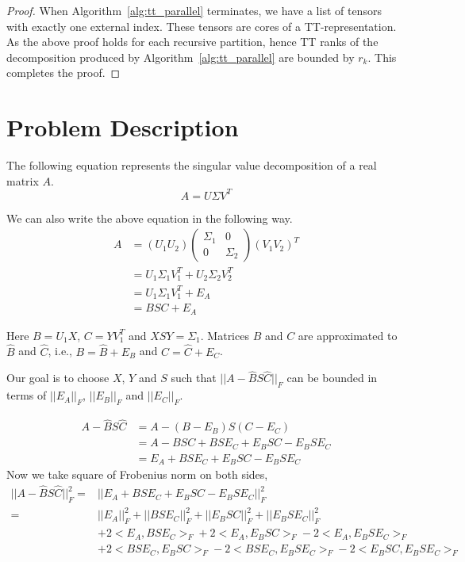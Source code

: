 \documentclass[runningheads]{llncs}
\begin{document}
\begin{proof}
	When Algorithm~\ref{alg:tt_parallel} terminates, we have a list of tensors with exactly one external index. These tensors are cores of a TT-representation. As the above proof holds for each recursive partition, hence TT ranks of the decomposition produced by Algorithm~\ref{alg:tt_parallel} are bounded by $r_k$. This completes the proof.
\end{proof}













\section{Problem Description}
The following equation represents the singular value decomposition of a real matrix $A$.
\begin{equation*}
A=U\Sigma V^T
\end{equation*}

\noindent We can also write the above equation in the following way.
\begin{align*}
A&=(U_1 U_2)\begin{pmatrix}
\Sigma_1 & 0\\
0 & \Sigma_2
\end{pmatrix}(V_1 V_2)^T\\
&= U_1\Sigma_1 V_1^T + U_2 \Sigma_2 V_2^T\\
&= U_1\Sigma_1 V_1^T + E_A \\
&= BSC + E_A
\end{align*}

\noindent Here $B = U_1 X$, $C=YV_1^T$ and $XSY = \Sigma_1$.  Matrices $B$ and $C$ are approximated to $\hat{B}$ and $\hat{C}$, i.e., $B = \hat{B} + E_B$ and $C = \hat{C} + E_C$.

\medskip
{\color{blue}
	\noindent Our goal is to choose $X$, $Y$ and $S$ such that $||A - \hat{B} S \hat{C}||_F$ can be bounded in terms of $||E_A||_F$, $||E_B||_F$ and $||E_C||_F$}.

\begin{align*}
A - \hat{B} S \hat{C} &= A - (B-E_B)S(C-E_C)\\
&= A - BSC + BSE_C +  E_BSC - E_BSE_C\\
&= E_A + BSE_C +  E_BSC - E_BSE_C
\end{align*}
Now we take square of Frobenius norm on both sides,
\begin{align*}
||A - \hat{B} S \hat{C}||_F^2 =& ||E_A + BSE_C +  E_BSC - E_BSE_C||_F^2 \\
=& ||E_A||_F^2 + ||BSE_C||_F^2 + ||E_BSC||_F^2 + ||E_BSE_C||_F^2 \\
& + 2\boldsymbol{<}E_A, BSE_C\boldsymbol{>}_F + 2<E_A, E_BSC>_F -2 <E_A, E_BSE_C>_F\\
& + 2 <BSE_C, E_BSC>_F -2 <BSE_C, E_BSE_C>_F - 2<E_BSC, E_BSE_C>_F
\end{align*}
\end{document}
